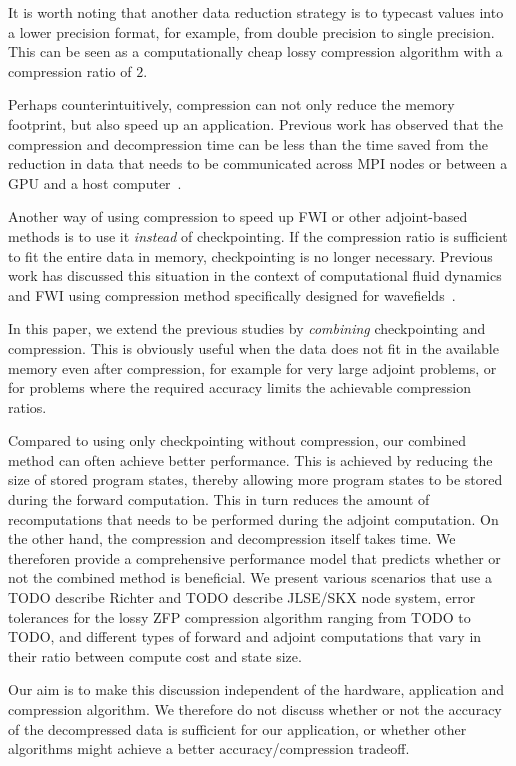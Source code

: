 \documentclass[conference]{IEEEtran}
\begin{document}
It is worth noting that another data reduction strategy is to typecast values
into a lower precision format, for example, from double precision to single
precision. This can be seen as a computationally cheap lossy compression
algorithm with a compression ratio of $2$.

Perhaps counterintuitively, compression can not only reduce the memory
footprint, but also speed up an application. Previous work has observed that the
compression and decompression time can be less than the time saved from the
reduction in data that needs to be communicated across MPI nodes or between a
GPU and a host computer~\cite{gpu-compression}.

Another way of using compression to speed up FWI or other adjoint-based methods
is to use it \emph{instead} of checkpointing. If the compression ratio is
sufficient to fit the entire data in memory, checkpointing is no longer
necessary. Previous work has discussed this situation in the context of
computational fluid dynamics~\cite{cyr2015towards} and FWI using compression
method specifically designed for
wavefields~\cite{dalmau2014lossy,boehm2016wavefield}.

In this paper, we extend the previous studies by \emph{combining} checkpointing
and compression. This is obviously useful when the data does not fit in the
available memory even after compression, for example for very large adjoint
problems, or for problems where the required accuracy limits the achievable
compression ratios.

Compared to using only checkpointing without compression, our combined method
can often achieve better performance. This is achieved by reducing the size of
stored program states, thereby allowing more program states to be stored during
the forward computation. This in turn reduces the amount of recomputations that
needs to be performed during the adjoint computation. On the other hand, the
compression and decompression itself takes time.  We thereforen provide a
comprehensive performance model that predicts whether or not the combined method
is beneficial. We present various scenarios that use a TODO describe Richter and
TODO describe JLSE/SKX node system, error tolerances for the lossy ZFP
compression algorithm ranging from TODO to TODO, and different types of forward
and adjoint computations that vary in their ratio between compute cost and state
size. 

Our aim is to make this discussion independent of the hardware, application and
compression algorithm. We therefore do not discuss whether or not the accuracy
of the decompressed data is sufficient for our application, or whether
other algorithms might achieve a better accuracy/compression tradeoff.
\end{document}
